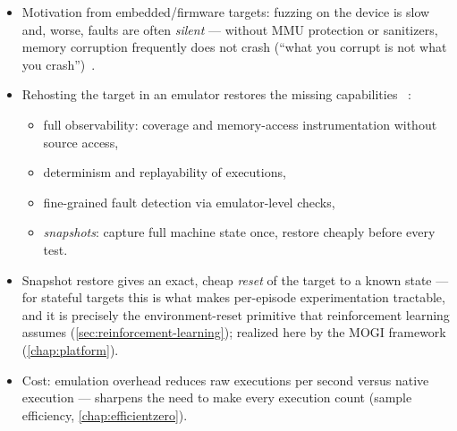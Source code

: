 \begin{itemize}
  \item Motivation from embedded/firmware targets: fuzzing on the device is slow and, worse,
    faults are often \emph{silent} --- without MMU protection or sanitizers, memory corruption
    frequently does not crash (``what you corrupt is not what you
    crash'')~\cite{muench_what_2018}.
  \item Rehosting the target in an emulator restores the missing capabilities~\cite{muench_what_2018}
    :
    \begin{itemize}
      \item full observability: coverage and memory-access instrumentation without source access,
      \item determinism and replayability of executions,
      \item fine-grained fault detection via emulator-level checks,
      \item \emph{snapshots}: capture full machine state once, restore cheaply before every test.
    \end{itemize}
  \item Snapshot restore gives an exact, cheap \emph{reset} of the target to a known state ---
    for stateful targets this is what makes per-episode experimentation tractable, and it is
    precisely the environment-reset primitive that reinforcement learning assumes
    (\cref{sec:reinforcement-learning}); realized here by the MOGI framework
    (\cref{chap:platform}).
  \item Cost: emulation overhead reduces raw executions per second versus native execution ---
    sharpens the need to make every execution count (sample efficiency,
    \cref{chap:efficientzero}).
\end{itemize}
